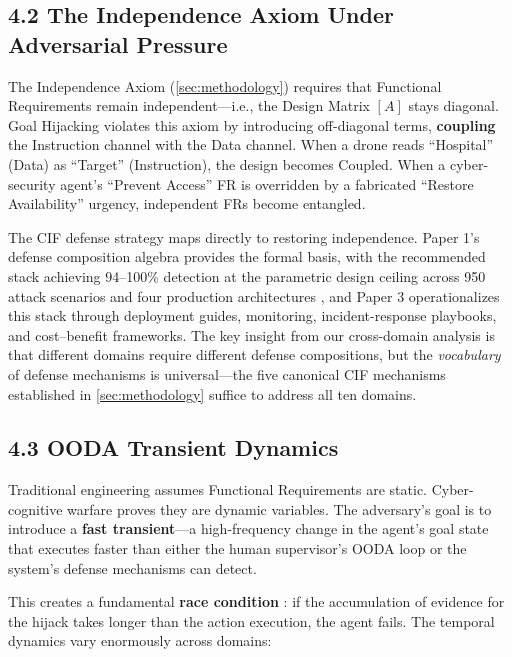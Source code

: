 \documentclass[
]{article}
\begin{document}
\subsection{4.2 The Independence Axiom Under Adversarial
Pressure}\label{the-independence-axiom-under-adversarial-pressure}

The Independence Axiom (\cref{sec:methodology}) requires that Functional
Requirements remain independent---i.e., the Design Matrix \([A]\) stays
diagonal. Goal Hijacking violates this axiom by introducing off-diagonal
terms, \textbf{coupling} the Instruction channel with the Data channel.
When a drone reads ``Hospital'' (Data) as ``Target'' (Instruction), the
design becomes Coupled. When a cyber-security agent's ``Prevent Access''
FR is overridden by a fabricated ``Restore Availability'' urgency,
independent FRs become entangled.

The CIF defense strategy maps directly to restoring independence. Paper
1's defense composition algebra \cite{friedman2026cogsec1} provides the
formal basis, with the recommended stack achieving 94--100\% detection
at the parametric design ceiling across 950 attack scenarios and four
production architectures \cite{friedman2026cogsec2}, and Paper 3
\cite{friedman2026cogsec3} operationalizes this stack through deployment
guides, monitoring, incident-response playbooks, and cost--benefit
frameworks. The key insight from our cross-domain analysis is that
different domains require different defense compositions, but the
\emph{vocabulary} of defense mechanisms is universal---the five
canonical CIF mechanisms established in \cref{sec:methodology} suffice
to address all ten domains.

\subsection{4.3 OODA Transient Dynamics}\label{ooda-transient-dynamics}

Traditional engineering assumes Functional Requirements are static.
Cyber-cognitive warfare proves they are dynamic variables. The
adversary's goal is to introduce a \textbf{fast transient}---a
high-frequency change in the agent's goal state that executes faster
than either the human supervisor's OODA loop or the system's defense
mechanisms can detect.

This creates a fundamental \textbf{race condition}
\cite{osinga2007science}: if the accumulation of evidence for the hijack
takes longer than the action execution, the agent fails. The temporal
dynamics vary enormously across domains:
\end{document}

